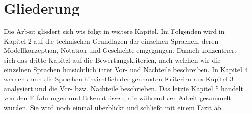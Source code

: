 \section{Gliederung}
\label{sc:Gliederung}
Die Arbeit gliedert sich wie folgt in weitere Kapitel. Im Folgenden wird in Kapitel 2 auf die technischen Grundlagen der einzelnen Sprachen, deren Modellkonzeption, Notation und Geschichte eingegangen. Danach konzentriert sich das dritte Kapitel auf die Bewertungskriterien, nach welchen wir die einzelnen Sprachen hinsichtlich ihrer Vor- und Nachteile beschreiben. In Kapitel 4 werden dann die Sprachen hinsichtlich der gennanten Kriterien aus Kapitel 3 analysiert und die Vor- bzw. Nachteile beschrieben.
Das letzte Kapitel 5 handelt von den Erfahrungen und Erkenntnissen, die während
der Arbeit gesammelt wurden. Sie wird noch einmal überblickt und schließt mit einem Fazit ab.
